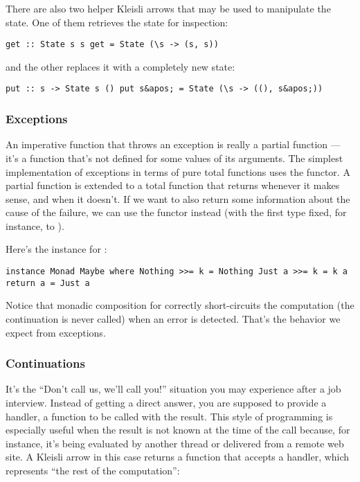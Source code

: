 There are also two helper Kleisli arrows that may be used to manipulate
the state. One of them retrieves the state for inspection:

\begin{verbatim}
get :: State s s get = State (\s -> (s, s))
\end{verbatim}

and the other replaces it with a completely new state:

\begin{verbatim}
put :: s -> State s () put s&apos; = State (\s -> ((), s&apos;))
\end{verbatim}

\subsubsection{Exceptions}\label{exceptions}

An imperative function that throws an exception is really a partial
function --- it's a function that's not defined for some values of its
arguments. The simplest implementation of exceptions in terms of pure
total functions uses the  functor. A partial function is
extended to a total function that returns  whenever it
makes sense, and  when it doesn't. If we want to also
return some information about the cause of the failure, we can use the
 functor instead (with the first type fixed, for
instance, to ).

Here's the  instance for :

\begin{verbatim}
instance Monad Maybe where Nothing >>= k = Nothing Just a >>= k = k a return a = Just a
\end{verbatim}

Notice that monadic composition for  correctly
short-circuits the computation (the continuation  is never
called) when an error is detected. That's the behavior we expect from
exceptions.

\subsubsection{Continuations}\label{continuations}

It's the ``Don't call us, we'll call you!'' situation you may experience
after a job interview. Instead of getting a direct answer, you are
supposed to provide a handler, a function to be called with the result.
This style of programming is especially useful when the result is not
known at the time of the call because, for instance, it's being
evaluated by another thread or delivered from a remote web site. A
Kleisli arrow in this case returns a function that accepts a handler,
which represents ``the rest of the computation'':

